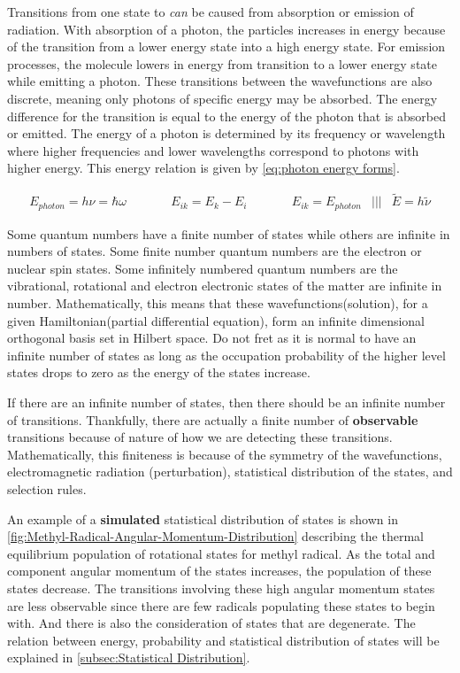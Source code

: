 \documentclass[11pt,a4paper]{book}
\begin{document}
	Transitions from one state to \textit{can} be caused from absorption or emission of radiation. With absorption of a photon, the particles increases in energy because of the transition from a lower energy state into a high energy state. For emission processes, the molecule lowers in energy from transition to a lower energy state while emitting a photon. These transitions between the wavefunctions are also discrete, meaning only photons of specific energy may be absorbed. The energy difference for the transition is equal to the energy of the photon that is absorbed or emitted. The energy of a photon is determined by its frequency or wavelength where higher frequencies and lower wavelengths correspond to photons with higher energy. This energy relation is given by \autoref{eq:photon energy forms}.
	
	\begin{equation}
		\label{eq:photon energy forms}
		\begin{array}{cccccccc}
		E_{photon}=h\nu=\hbar \omega &\qquad &E_{ik}=E_{k}-E_{i}  & \qquad & E_{ik} = E_{photon}& ||| &\tilde{E}=h\tilde{\nu}
		\end{array}
	\end{equation} 
	
	Some quantum numbers have a finite number of states while others are infinite in numbers of states. Some finite number quantum numbers are the electron or nuclear spin states. Some infinitely numbered quantum numbers are the vibrational, rotational and electron electronic states of the matter are infinite in number. Mathematically, this means that these wavefunctions(solution), for a given Hamiltonian(partial differential equation), form an infinite dimensional orthogonal basis set in Hilbert space. Do not fret as it is normal to have an infinite number of states as long as the occupation probability of the higher level states drops to zero as the energy of the states increase. 
	
	If there are an infinite number of states, then there should be an infinite number of transitions. Thankfully, there are actually a finite number of \textbf{observable} transitions because of nature of how we are detecting these transitions. Mathematically, this finiteness is because of the symmetry of the wavefunctions, electromagnetic radiation (perturbation), statistical distribution of the states, and selection rules. 
	
	An example of a \textbf{simulated} statistical distribution of states is shown in \autoref{fig:Methyl-Radical-Angular-Momentum-Distribution} describing the thermal equilibrium population of rotational states for methyl radical. As the total and component angular momentum of the states increases, the population of these states decrease. The transitions involving these high angular momentum states are less observable since there are few radicals populating these states to begin with. And there is also the consideration of states that are degenerate. The relation between energy, probability and statistical distribution of states will be explained in \autoref{subsec:Statistical Distribution}. 
	
\end{document}
